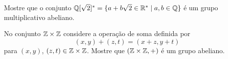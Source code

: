 \documentclass[12pt]{article}
\begin{document}
\vesp

\questao{} Mostre que o conjunto $\mathbb{Q}[\sqrt{2}]^*=\{ a + b\sqrt{2} \in
\mathbb{R}^* \mid  a, b \in \mathbb{Q} \}$ {\'e} um grupo multiplicativo abeliano.

\vesp

\questao{} No conjunto $\mathbb{Z} \times \mathbb{Z}$ considere a opera\c{c}\~ao de soma definida por
\[
	(x, y) + (z, t) = (x + z, y + t)
\]
para $(x, y)$, $(z, t) \in \mathbb{Z} \times \mathbb{Z}$. Mostre que $(\mathbb{Z}\times\mathbb{Z}, +)$ \'e um grupo abeliano.






\end{document}
